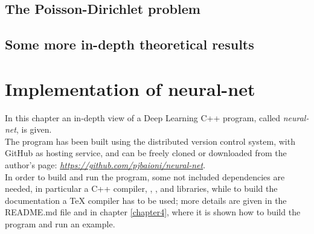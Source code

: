 \documentclass[12pt, a4paper]{report}
\theoremstyle{definition}
\begin{document}
\section{The Poisson-Dirichlet problem}\label{section2.1}

\section{Some more in-depth theoretical results}\label{section2.2}




\chapter{Implementation of neural-net}\label{chapter3}
In this chapter an in-depth view of a Deep Learning C++ program, called \textit{neural-net}, is given.\\
The program has been built using the \cite{git} distributed version control system, with GitHub as hosting service, and can be freely cloned or downloaded from the author's page: \href{https://github.com/pjbaioni/neural-net}{\emph{https://github.com/pjbaioni/neural-net}}.\\
In order to build and run the program, some not included dependencies are needed, in particular a C++ compiler, \cite{make}, \cite{gnuplot}, \cite{eigen} and \cite{boost} libraries, while to build the documentation a TeX compiler has to be used; more details are given in the README.md file and in chapter \ref{chapter4}, where it is shown how to build the program and run an example. 
\end{document}
